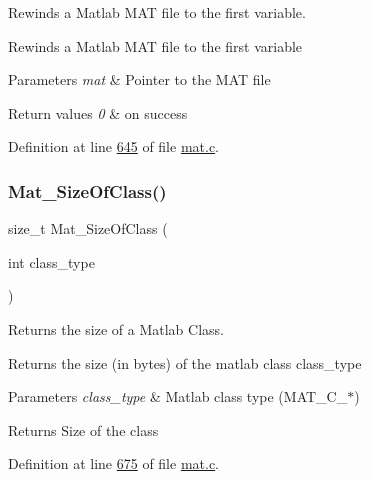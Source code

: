 Rewinds a Matlab M\+AT file to the first variable. 

Rewinds a Matlab M\+AT file to the first variable


\begin{DoxyParams}{Parameters}
{\em mat} & Pointer to the M\+AT file \\
\hline
\end{DoxyParams}

\begin{DoxyRetVals}{Return values}
{\em 0} & on success \\
\hline
\end{DoxyRetVals}


Definition at line \hyperlink{mat_8c_source_l00645}{645} of file \hyperlink{mat_8c_source}{mat.\+c}.

\mbox{\label{group___m_a_t_ga2bf682f015b22fa796a8885e997661e7}} 
\subsubsection{\texorpdfstring{Mat\+\_\+\+Size\+Of\+Class()}{Mat\_SizeOfClass()}}
{\footnotesize\ttfamily size\+\_\+t Mat\+\_\+\+Size\+Of\+Class (\begin{DoxyParamCaption}\item[{int}]{class\+\_\+type }\end{DoxyParamCaption})}



Returns the size of a Matlab Class. 

Returns the size (in bytes) of the matlab class class\+\_\+type


\begin{DoxyParams}{Parameters}
{\em class\+\_\+type} & Matlab class type (M\+A\+T\+\_\+\+C\+\_\+$\ast$) \\
\hline
\end{DoxyParams}
\begin{DoxyReturn}{Returns}
Size of the class 
\end{DoxyReturn}


Definition at line \hyperlink{mat_8c_source_l00675}{675} of file \hyperlink{mat_8c_source}{mat.\+c}.

\mbox{\label{group___m_a_t_gaef5689cace7c4165c3cbf8fa17d1ebcd}} 
